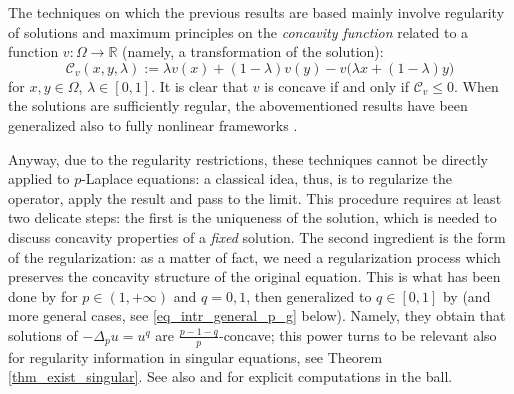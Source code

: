 \documentclass[11pt, reqno]{amsart}
\theoremstyle{definition}
\numberwithin{equation}{section}
\newcommand{\R}{\mathbb{R}}
\newcommand{\mc}[1]{\mathcal{#1}}
\begin{document}
\medskip

The techniques on which the previous results are based mainly involve regularity of solutions and maximum principles on the \emph{concavity function} related to a function $v: \Omega \to \R$ (namely, a transformation of the solution):
$$\mc{C}_{v}(x,y,\lambda):= \lambda v(x) + (1-\lambda) v(y) - v\big( \lambda x + (1-\lambda) y\big)$$
for $x,y \in \Omega$, $\lambda \in [0,1]$. 
It is clear that $v$ is concave if and only if $\mc{C}_v \leq 0$. 
When the solutions are sufficiently regular, the abovementioned results have been generalized also to fully nonlinear frameworks \cite{BiSa13}.

Anyway, due to the regularity restrictions, these techniques cannot be directly applied to $p$-Laplace equations: a classical idea, thus, is to regularize the operator, apply the result and pass to the limit. 
This procedure requires at least two delicate steps: the first is the uniqueness of the solution, which is needed to discuss concavity properties of a \emph{fixed} solution. 
The second ingredient is the form of the regularization: as a matter of fact, we need a regularization process which preserves the concavity structure of the original equation. 
This is what has been done by \cite{Sak87} for $p \in (1,+\infty)$ and $q=0,1$, then generalized to $q \in [0,1]$ by \cite{BMS22} (and more general cases, see \eqref{eq_intr_general_p_g} below). 
Namely, they obtain that solutions of $-\Delta_p u = u^q$ are $\frac{p-1-q}{p}$-concave; this power turns to be relevant also for regularity information in singular equations, see Theorem \ref{thm_exist_singular}.
See also \cite[Section 3]{Lind94} and \cite[Section 3]{Kaw90} for explicit computations in the ball. 
\end{document}
